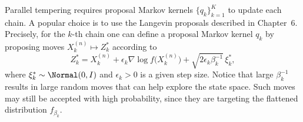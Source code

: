 Parallel tempering requires proposal Markov kernels $\{q_k\}_{k=1}^K$ to update each chain.
A popular choice is to use the Langevin proposals described in Chapter~6. Precisely, for the
$k$-th chain one can define a proposal Markov kernel $q_k$ by proposing moves
$X_k^{(n)} \mapsto Z_k^*$ according to
\[
  Z_k^* = X_k^{(n)} + \epsilon_k \nabla\log f\!\bigl(X_k^{(n)}\bigr)
          + \sqrt{2\epsilon_k \beta_k^{-1}}\, \xi_k^*,
\]
where $\xi_k^* \sim \Normal(0, I)$ and $\epsilon_k > 0$ is a given step size. Notice that large
$\beta_k^{-1}$ results in large random moves that can help explore the state space. Such moves
may still be accepted with high probability, since they are targeting the flattened distribution
$f_{\beta_k}$.

\begin{center}
\end{center}
